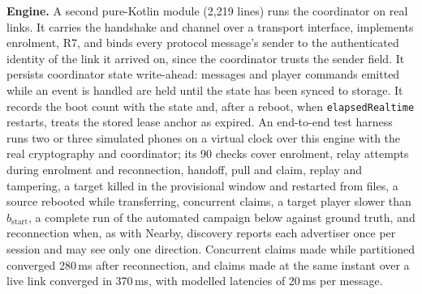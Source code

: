 \documentclass[conference]{IEEEtran}
\begin{document}
\textbf{Engine.} A second pure-Kotlin module (2{,}219 lines) runs the coordinator on real links. It carries the handshake and channel over a transport interface, implements enrolment, R7, and binds every protocol message's sender to the authenticated identity of the link it arrived on, since the coordinator trusts the sender field. It persists coordinator state write-ahead: messages and player commands emitted while an event is handled are held until the state has been synced to storage. It records the boot count with the state and, after a reboot, when \texttt{elapsedRealtime} restarts, treats the stored lease anchor as expired. An end-to-end test harness runs two or three simulated phones on a virtual clock over this engine with the real cryptography and coordinator; its 90 checks cover enrolment, relay attempts during enrolment and reconnection, handoff, pull and claim, replay and tampering, a target killed in the provisional window and restarted from files, a source rebooted while transferring, concurrent claims, a target player slower than $b_{\mathrm{start}}$, a complete run of the automated campaign below against ground truth, and reconnection when, as with Nearby, discovery reports each advertiser once per session and may see only one direction. Concurrent claims made while partitioned converged 280\,ms after reconnection, and claims made at the same instant over a live link converged in 370\,ms, with modelled latencies of 20\,ms per message.
\end{document}
